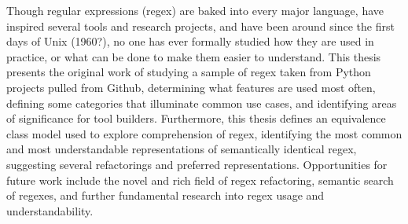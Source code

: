 
Though regular expressions (regex) are baked into every major language, have inspired several tools and research projects, and have been around since the first days of Unix (1960?), no one has ever formally studied how they are used in practice, or what can be done to make them easier to understand.  This thesis presents the original work of studying a sample of regex taken from Python projects pulled from Github, determining what features are used most often, defining some categories that illuminate common use cases, and identifying areas of significance for tool builders.  Furthermore, this thesis defines an equivalence class model used to explore comprehension of regex, identifying the most common and most understandable representations of semantically identical regex, suggesting several refactorings and preferred representations.  Opportunities for future work include the novel and rich field of regex refactoring, semantic search of regexes, and further fundamental research into regex usage and understandability.
